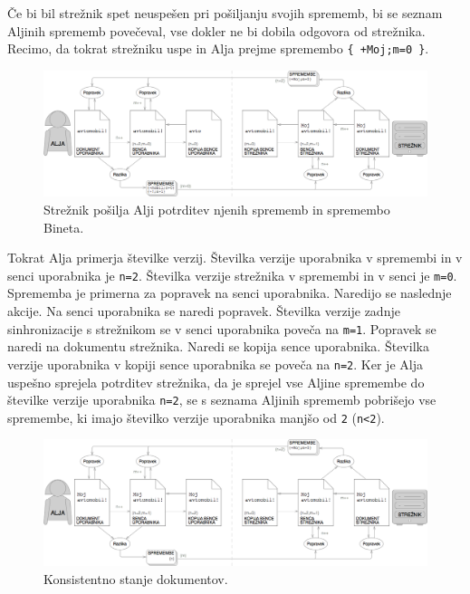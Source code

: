 \documentclass[a4paper, 12pt, twoside]{book}
\begin{document}
Če bi bil strežnik spet neuspešen pri pošiljanju svojih sprememb, bi se seznam Aljinih sprememb povečeval, vse dokler ne bi dobila odgovora od strežnika. Recimo, da tokrat strežniku uspe in Alja prejme spremembo {\tt \{ +Moj;m=0 \}}.

\begin{figure}[placement h]
\begin{center}
\includegraphics[width=16cm]{ds9.png}
\end{center}
\caption{Strežnik pošilja Alji potrditev njenih sprememb in spremembo Bineta.}
\label{ds9}
\end{figure}

Tokrat Alja primerja številke verzij. Številka verzije uporabnika v spremembi in v senci uporabnika je {\tt n=2}. Številka verzije strežnika v spremembi in v senci je {\tt m=0}. Sprememba je primerna za popravek na senci uporabnika. Naredijo se naslednje akcije. Na senci uporabnika se naredi popravek. Številka verzije zadnje sinhronizacije s strežnikom se v senci uporabnika poveča na {\tt m=1}. Popravek se naredi na dokumentu strežnika. Naredi se kopija sence uporabnika. Številka verzije uporabnika v kopiji sence uporabnika se poveča na {\tt n=2}. Ker je Alja uspešno sprejela potrditev strežnika, da je sprejel vse Aljine spremembe do številke verzije uporabnika {\tt n=2}, se s seznama Aljinih sprememb pobrišejo vse spremembe, ki imajo številko verzije uporabnika manjšo od {\tt 2} ({\tt n<2}).

\begin{figure}[placement h]
\begin{center}
\includegraphics[width=16cm]{ds10.png}
\end{center}
\caption{Konsistentno stanje dokumentov.}
\label{ds10}
\end{figure}
\end{document}
